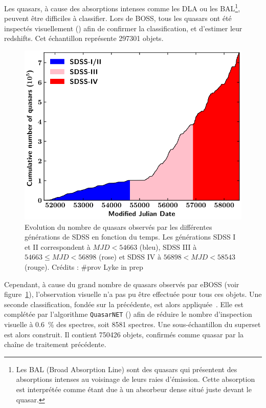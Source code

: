 \documentclass[11pt, twoside, a4paper, openright]{report}
\begin{document}
Les quasars, à cause des absorptions intenses comme les DLA ou les BAL\footnote{Les BAL (Broad Absorption Line) sont des quasars qui présentent des absorptions intenses au voisinage de leurs raies d'émission. Cette absorption est interprétée comme étant due à un absorbeur dense situé juste devant le quasar.}, peuvent être difficiles à classifier.
Lors de BOSS, tous les quasars ont été inspectés visuellement (\cite{Paris2016}) afin de confirmer la classification, et d'estimer leur redshifts. Cet échantillon représente \num{297301} objets.
\begin{figure}
  \centering
  \includegraphics[scale=0.35]{quasar_number}
  \caption{Evolution du nombre de quasars observés par les différentes générations de SDSS en fonction du temps. Les générations SDSS I et II correspondent à $MJD < 54663$ (bleu), SDSS III à $54663 \leq MJD < 56898$ (rose) et SDSS IV à $56898 < MJD < 58543$ (rouge). Crédits : \#prov Lyke in prep}
  \label{fig:quasar_number}
\end{figure}
Cependant, à cause du grand nombre de quasars observés par eBOSS (voir figure~\ref{fig:quasar_number}), l'observation visuelle n'a pas pu être effectuée pour tous ces objets. Une seconde classification, fondée sur la précédente, est alors appliquée~\cite{CITE:Lyke in prep}. Elle est complétée par l'algorithme \texttt{QuasarNET} (\cite{Busca2018}) afin de réduire le nombre d'inspection visuelle à \SI{0.6}{\percent} des spectres, soit \num{8581} spectres. Une sous-échantillon du superset est alors construit. Il contient \num{750426} objets, confirmés comme quasar par la chaîne de traitement précédente.
\end{document}
